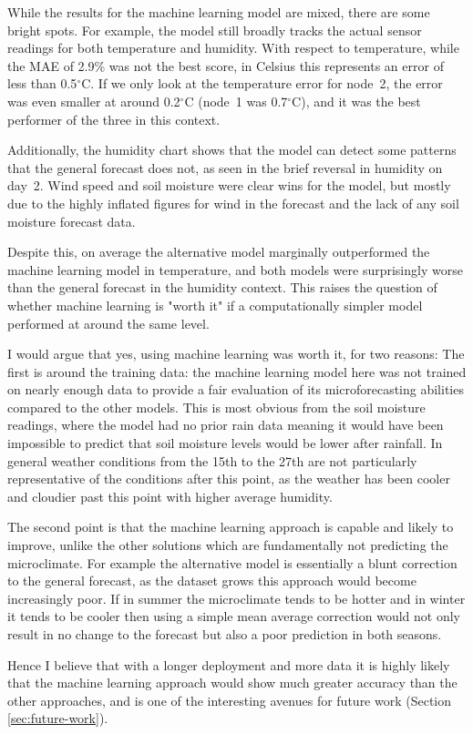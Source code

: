 While the results for the machine learning model are mixed, there are some
bright spots. For example, the model still broadly tracks the actual sensor
readings for both temperature and humidity. With respect to temperature, while
the MAE of 2.9\% was not the best score, in Celsius this represents an error of
less than 0.5$^\circ$C. If we only look at the temperature error for node~2, the
error was even smaller at around 0.2$^\circ$C (node~1 was 0.7$^\circ$C), and it
was the best performer of the three in this context.

Additionally, the humidity chart shows that the model can detect some patterns
that the general forecast does not, as seen in the brief reversal in humidity on
day~2. Wind speed and soil moisture were clear wins for the model, but mostly
due to the highly inflated figures for wind in the forecast and the lack of any
soil moisture forecast data.

Despite this, on average the alternative model marginally outperformed the
machine learning model in temperature, and both models were surprisingly worse
than the general forecast in the humidity context. This raises the question of
whether machine learning is "worth it" if a computationally simpler model
performed at around the same level.

I would argue that yes, using machine learning was worth it, for two reasons:
The first is around the training data: the machine learning model here was not
trained on nearly enough data to provide a fair evaluation of its
microforecasting abilities compared to the other models. This is most obvious
from the soil moisture readings, where the model had no prior rain data meaning
it would have been impossible to predict that soil moisture levels would be
lower after rainfall. In general weather conditions from the 15th to the 27th
are not particularly representative of the conditions after this point, as the
weather has been cooler and cloudier past this point with higher average
humidity.

The second point is that the machine learning approach is capable and likely to
improve, unlike the other solutions which are fundamentally not predicting the
microclimate. For example the alternative model is essentially a blunt
correction to the general forecast, as the dataset grows this approach would
become increasingly poor. If in summer the microclimate tends to be hotter and
in winter it tends to be cooler then using a simple mean average correction
would not only result in no change to the forecast but also a poor prediction in
both seasons.

Hence I believe that with a longer deployment and more data it is highly likely
that the machine learning approach would show much greater accuracy than the
other approaches, and is one of the interesting avenues for future work (Section
\ref{sec:future-work}).